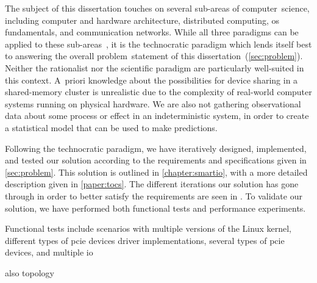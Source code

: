 The subject of this dissertation touches on several sub-areas of computer~science, including computer and hardware architecture, distributed computing, \gls{os} fundamentals, and communication networks.
%
While all three paradigms can be applied to these sub-areas~\cite{Comer1989}, it is the technocratic paradigm which lends itself best to answering the overall problem~statement of this dissertation~(\cref{sec:problem}).
%
Neither the rationalist nor the scientific paradigm are particularly well-suited in this context.
%
A~priori knowledge about the possibilities for device sharing in a shared-memory cluster is unrealistic due to the complexity of real-world computer systems running on physical hardware.
%
We are also not gathering observational data about some process or effect in an indeterministic system, in order to create a statistical model that can be used to make predictions.



Following the technocratic paradigm, we have iteratively designed, implemented, and tested our solution according to the requirements and specifications given in \cref{sec:problem}.
%
This solution is outlined in \cref{chapter:smartio}, with a more detailed description given in \cref{paper:tocs}.
%
The different iterations our solution has gone through in order to better satisfy the requirements are seen in .
%
To validate our solution, we have performed both functional tests and performance experiments.



Functional tests include scenarios with multiple versions of the Linux kernel, different types of \gls{pcie} devices driver implementations, several types of \gls{pcie} devices, and multiple \gls{io}

also topology

%
%
%
%
%
%
%
%
%
%
%
%
%
%
%
%
%




